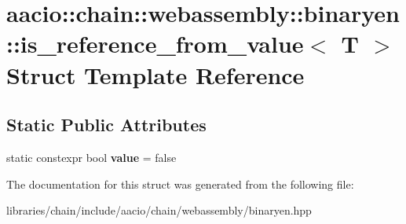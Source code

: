 \hypertarget{structaacio_1_1chain_1_1webassembly_1_1binaryen_1_1is__reference__from__value}{}\section{aacio\+:\+:chain\+:\+:webassembly\+:\+:binaryen\+:\+:is\+\_\+reference\+\_\+from\+\_\+value$<$ T $>$ Struct Template Reference}
\label{structaacio_1_1chain_1_1webassembly_1_1binaryen_1_1is__reference__from__value}
\subsection*{Static Public Attributes}
\begin{DoxyCompactItemize}
\item 
\mbox{\label{structaacio_1_1chain_1_1webassembly_1_1binaryen_1_1is__reference__from__value_a2d20795e69028d8cefc4d1eef9c8a636}} 
static constexpr bool {\bfseries value} = false
\end{DoxyCompactItemize}


The documentation for this struct was generated from the following file\+:\begin{DoxyCompactItemize}
\item 
libraries/chain/include/aacio/chain/webassembly/binaryen.\+hpp\end{DoxyCompactItemize}
